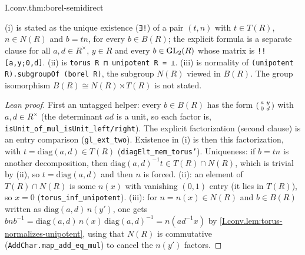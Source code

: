 \begin{theorem}[$B=T\ltimes N$]
\end{theorem}
\begin{tfformal}{I.conv.thm:borel-semidirect}
\begin{tffidelity}
(i) is stated as the unique existence (\texttt{∃!}) of a pair $(t,n)$ with $t\in T(R)$, $n\in N(R)$ and $b=tn$, for every $b\in B(R)$; the explicit formula is a separate clause for all $a,d\in R^\times$, $y\in R$ and every $b\in\mathrm{GL}_2(R)$ whose matrix is \texttt{!![a,y;0,d]}. (ii) is \texttt{torus R ⊓ unipotent R = ⊥}. (iii) is normality of \texttt{(unipotent R).subgroupOf (borel R)}, the subgroup $N(R)$ viewed in $B(R)$. The group isomorphism $B(R)\cong N(R)\rtimes T(R)$ is not stated.
\end{tffidelity}
\end{tfformal}
\begin{proof}[Lean proof]
First an untagged helper: every $b\in B(R)$ has the form $\begin{psmallmatrix}a&y\\0&d\end{psmallmatrix}$ with $a,d\in R^\times$ (the determinant $ad$ is a unit, so each factor is, \texttt{isUnit\_of\_mul\_isUnit\_left/right}). The explicit factorization (second clause) is an entry comparison (\texttt{gl\_ext\_two}). Existence in (i) is then this factorization, with $t=\mathrm{diag}(a,d)\in T(R)$ (\texttt{diagElt\_mem\_torus'}). Uniqueness: if $b=tn$ is another decomposition, then $\mathrm{diag}(a,d)^{-1}t\in T(R)\cap N(R)$, which is trivial by (ii), so $t=\mathrm{diag}(a,d)$ and then $n$ is forced. (ii): an element of $T(R)\cap N(R)$ is some $n(x)$ with vanishing $(0,1)$ entry (it lies in $T(R)$), so $x=0$ (\texttt{torus\_inf\_unipotent}). (iii): for $n=n(x)\in N(R)$ and $b\in B(R)$ written as $\mathrm{diag}(a,d)\,n(y')$, one gets $bnb^{-1}=\mathrm{diag}(a,d)\,n(x)\,\mathrm{diag}(a,d)^{-1}=n(ad^{-1}x)$ by \cref{I.conv.lem:torus-normalizes-unipotent}, using that $N(R)$ is commutative (\texttt{AddChar.map\_add\_eq\_mul}) to cancel the $n(y')$ factors.
\end{proof}

